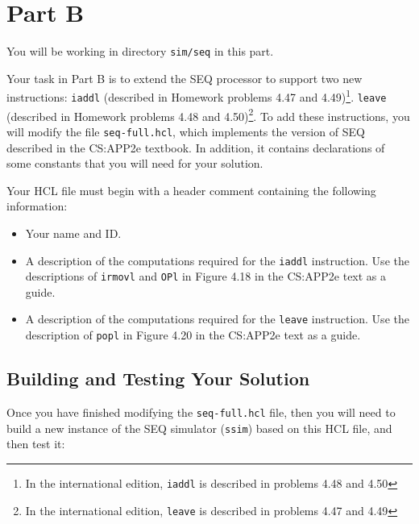 \documentclass[11pt]{article}
\begin{document}
\section{Part B}

You will be working in directory \texttt{sim/seq} in this part.

Your task in Part B is to extend the SEQ processor to support two new
instructions:
\texttt{iaddl} (described in Homework problems 4.47 and 4.49)\footnote{In the international edition, \texttt{iaddl} is described in problems 4.48 and 4.50}. 
\texttt{leave} (described in Homework problems 4.48 and 4.50)\footnote{In the international edition, \texttt{leave} is described in problems 4.47 and 4.49}.
To add these instructions, you will modify the file
\texttt{seq-full.hcl},
which implements the version of SEQ described in the CS:APP2e textbook.
In addition, it contains declarations of some constants that you will
need for your solution.

Your HCL file must begin with a header comment containing
the following information:
\begin{itemize}
\item Your name and ID.
\item A description of the computations required for the \texttt{iaddl}
instruction. Use the descriptions of \texttt{irmovl} and {\tt OPl} 
in Figure 4.18 in the CS:APP2e text as a guide.
\item A description of the computations required for the \texttt{leave}
instruction. Use the description of \texttt{popl} in Figure 4.20 in
the CS:APP2e text as a guide.
\end{itemize}

\subsection*{Building and Testing Your Solution}

Once you have finished modifying the \texttt{seq-full.hcl} file, then
you will need to build a new instance of the SEQ simulator (\texttt{ssim})
based on this HCL file, and then test it:
\end{document}
